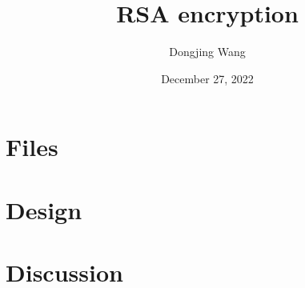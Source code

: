 \documentclass{article}
\title{RSA encryption}
\author{Dongjing Wang}
\date{December 27, 2022}
\begin{document}
\maketitle

\section{Files}
\section{Design}
\section{Discussion}
\end{document}
